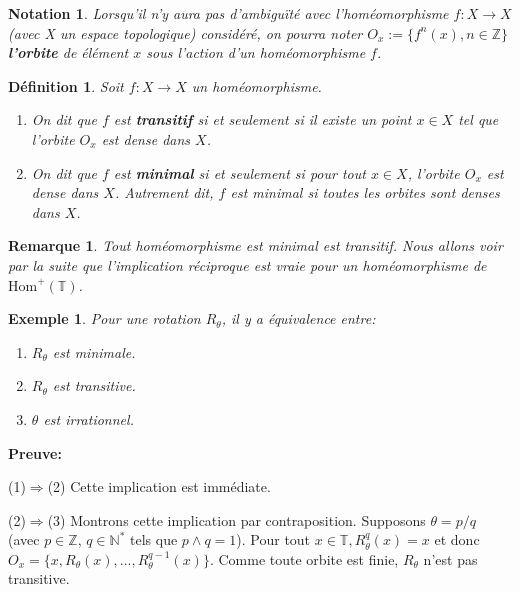 \documentclass[11pt,a4 paper]{article}
\newtheorem{definition}[theoreme]{Définition}
\newtheorem{ex}[theoreme]{Exemple}
\newtheorem{nota}[theoreme]{Notation}
\newtheorem{rmq}[theoreme]{Remarque}
\newcommand{\Tbb}{\mathbb{T}}
\newcommand{\HomT}{\mathrm{Hom}^+(\Tbb)}
\newenvironment{defi}{\begin{box_defi}\begin{definition}}{\end{definition}\end{box_defi}}
\begin{document}
\begin{nota}
	Lorsqu'il n'y aura pas d'ambiguïté avec l'homéomorphisme $f: X \to X$ (avec X un espace topologique) considéré, on pourra noter $O_x := \lbrace f^n(x), n\in \mathbb{Z}\rbrace$ \textbf{l'orbite} de élément $x$ sous l'action d'un homéomorphisme $f$.
\end{nota}


\begin{defi}
		Soit $f: X \to X$ un homéomorphisme. 
		\begin{enumerate}
			\item On dit que $f$ est \textbf{transitif} si et seulement si il existe un point $x \in X$ tel que l'orbite $O_x$ est dense dans $X$.
			\item	On dit que $f$ est \textbf{minimal} si et seulement si pour tout $x \in X$, l'orbite $O_x$ est dense dans $X$. Autrement dit, $f$ est minimal si toutes les orbites sont denses dans $X$.
		\end{enumerate} 	
\end{defi}









\begin{rmq}
Tout homéomorphisme est minimal est transitif. Nous allons voir par la suite que l'implication réciproque est vraie pour un homéomorphisme de $\HomT$.
\end{rmq}




\begin{ex}\label{exemple rot}
	Pour une rotation $R_\theta$, il y a équivalence entre: 
	\begin{enumerate}
		\item $R_{\theta}$ est minimale.
		\item $R_{\theta}$ est transitive.
		\item $\theta$ est irrationnel.
	\end{enumerate} 
\end{ex}

\textbf{Preuve:}
	\par (1)$\Rightarrow$(2) Cette implication est immédiate.\\
	
	\par(2)$\Rightarrow$(3) Montrons cette implication par contraposition. Supposons $\theta = p/q$ (avec $p\in \mathbb{Z}$, $q \in \mathbb{N}^*$ tels que $p \wedge q =1$). Pour tout $x \in \Tbb, R_{\theta}^q(x)=x$ et donc $O_x = \lbrace x, R_{\theta}(x),...,R_{\theta}^{q-1}(x) \rbrace$. Comme toute orbite est finie, $R_{\theta}$ n'est pas transitive.\\
\end{document}

